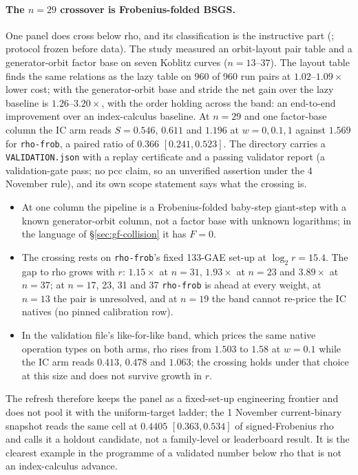 \paragraph{The $n=29$ crossover is Frobenius-folded BSGS.} One panel does
cross below rho, and its classification is the instructive part
(; protocol frozen
before data). The study measured an orbit-layout pair table and a
generator-orbit factor base on seven Koblitz curves ($n=13$--$37$). The
layout table finds the same relations as the lazy table on 960 of 960 run
pairs at $1.02$--$1.09\times$ lower cost; with the generator-orbit base and
stride the net gain over the lazy baseline is $1.26$--$3.20\times$, with the
order holding across the band: an end-to-end improvement over an
index-calculus baseline. At $n=29$ and one factor-base column the IC arm
reads $S=0.546$, $0.611$ and $1.196$ at $w=0,0.1,1$ against $1.569$ for
\texttt{rho-frob}, a paired ratio of $0.366$ $[0.241,0.523]$. The directory
carries a \texttt{VALIDATION.json} with a replay certificate and a passing
validator report (a validation-gate pass; no pcc claim, so an unverified
assertion under the 4 November rule), and its own scope statement says what
the crossing is.
\begin{itemize}
\item At one column the pipeline is a Frobenius-folded baby-step
  giant-step with a known generator-orbit column, not a factor base with
  unknown logarithms; in the language of \S\ref{sec:gf-collision} it has
  $F=0$.
\item The crossing rests on \texttt{rho-frob}'s fixed 133-GAE set-up at
  $\log_2r=15.4$. The gap to rho grows with $r$: $1.15\times$ at $n=31$,
  $1.93\times$ at $n=23$ and $3.89\times$ at $n=37$; at $n=17$, 23, 31 and
  37 \texttt{rho-frob} is ahead at every weight, at $n=13$ the pair is
  unresolved, and at $n=19$ the band cannot re-price the IC natives (no
  pinned calibration row).
\item In the validation file's like-for-like band, which prices the same
  native operation types on both arms, rho rises from $1.503$ to $1.58$ at
  $w=0.1$ while the IC arm reads $0.413$, $0.478$ and $1.063$; the crossing
  holds under that choice at this size and does not survive growth in $r$.
\end{itemize}
The refresh therefore keeps the panel as a fixed-set-up engineering
frontier and does not pool it with the uniform-target ladder; the 1
November current-binary snapshot reads the same cell at $0.4405$
$[0.363,0.534]$ of signed-Frobenius rho and calls it a holdout candidate,
not a family-level or leaderboard result. It is the clearest example in
the programme of a validated number below rho that is not an
index-calculus advance.

